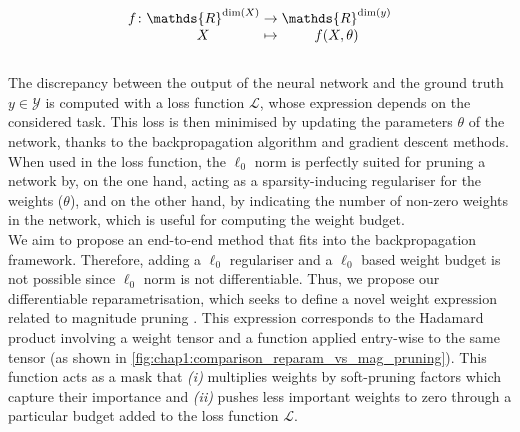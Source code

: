 \begin{equation}
  \begingroup
  \setlength\arraycolsep{0pt}
  f \colon\begin{array}[t]{c >{{}}c<{{}} c}
    \mathds{R}^{\dim (X)} & \to     & \mathds{R}^{\dim (y)} \\
    X                     & \mapsto & f(X, \theta)
  \end{array}
  \endgroup
\end{equation}\\

The discrepancy between the output of the neural network and the ground truth $y
\in \mathcal{Y}$ is computed with a loss function $\mathcal{L}$, whose
expression depends on the considered task. This loss is then minimised by
updating the parameters $\theta$ of the network, thanks to the backpropagation
algorithm \cite{rumelhart1985learning,rumelhart1986learning} and gradient
descent methods.\\

When used in the loss function, the $\ell_0$ norm is perfectly suited for
pruning a network by, on the one hand, acting as a sparsity-inducing regulariser
for the weights ($\theta$), and on the other hand, by indicating the number of
non-zero weights in the network, which is useful for computing the weight
budget. \\

We aim to propose an end-to-end method that fits into the backpropagation
framework. Therefore, adding a $\ell_0$ regulariser and a $\ell_0$ based weight budget
is not possible since $\ell_0$ norm is not differentiable. Thus, we propose our
differentiable reparametrisation, which seeks to define a novel weight
expression related to magnitude pruning
\cite{DBLP:conf/nips/CunDS89,DBLP:conf/nips/HanPTD15}. This expression
corresponds to the Hadamard product involving a weight tensor and a function
applied entry-wise to the same tensor (as shown in
\cref{fig:chap1:comparison_reparam_vs_mag_pruning}). This function acts as a
mask that \emph{(i)} multiplies weights by soft-pruning factors which capture their
importance and \emph{(ii)} pushes less important weights to zero through a particular
budget added to the loss function $\mathcal{L}$. \\

